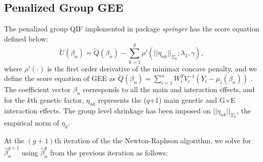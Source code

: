 \documentclass[12pt]{article}
\begin{document}
\subsection{Penalized Group GEE}

The penalized group QIF implemented in package \emph{springer} has the score equation defined below:
\begin{equation*}
\tilde{U}(\beta_n)=\tilde{Q}(\beta_n)-\sum_{k=1}^{p}\rho'(||\eta_{nk}||_{\Sigma_{k}};\lambda_{1},\gamma),
\end{equation*}
where $\rho'(\cdot)$ is the first order derivative of the minimax concave penalty, and we define the score equation of GEE as $\tilde{Q}(\beta_n)=\sum_{i=1}^{n}W_{i}^{T}V_i^{-1}(Y_i-\mu_i (\beta_n))$ . The coefficient vector $\beta_n$ corresponds to all the main and interaction effects, and for the $k$th genetic factor, $\eta_{nk}$ represents the ($q$+1) main genetic and G$\times$E interaction effects. The group level shrinkage has been imposed on $||\eta_{nk}||_{\Sigma_{k}}$, the empirical norm of $\eta_{k}$. 

At the $(g+1)$th iteration of the the Newton-Raphson algorithm, we solve for $\hat{\beta}_{n}^{g+1}$ using $\hat{\beta}_{n}^{g}$ from the previous iteration as follows:
\end{document}
